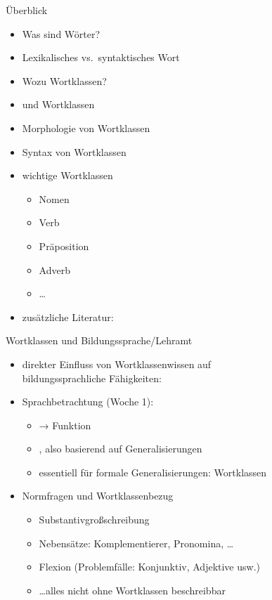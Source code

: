 \begin{frame}
  {Überblick}
  \pause
  \begin{itemize}[<+->]
    \item Was sind Wörter?
    \item Lexikalisches vs.\ syntaktisches Wort
      \Halbzeile
    \item Wozu Wortklassen?
    \item {} und Wortklassen
    \item \alert{Morphologie} von Wortklassen
    \item \alert{Syntax} von Wortklassen
      \Halbzeile
    \item wichtige Wortklassen
      \begin{itemize}[<+->]
        \item Nomen
        \item Verb
        \item Präposition
        \item Adverb
        \item \ldots
      \end{itemize}
      \Halbzeile
    \item zusätzliche Literatur: \citet{Engel2009}
  \end{itemize}
\end{frame}

\begin{frame}
  {Wortklassen und Bildungssprache\slash Lehramt}
  \pause
  \begin{itemize}[<+->]
    \item direkter Einfluss von Wortklassenwissen auf\\
      bildungssprachliche Fähigkeiten: 
      \Zeile
    \item Sprachbetrachtung (Woche 1):
      \begin{itemize}[<+->]
        \item {} → \alert{Funktion}
        \item {}, also basierend auf \alert{Generalisierungen}
        \item essentiell für formale Generalisierungen: \alert{Wortklassen}
      \end{itemize}
      \Zeile
    \item Normfragen und Wortklassenbezug
      \begin{itemize}
        \item \alert{Substantivgroßschreibung}
        \item Nebensätze: Komplementierer, Pronomina, \ldots
        \item Flexion (Problemfälle: Konjunktiv, Adjektive usw.)
        \item \dots alles nicht ohne Wortklassen beschreibbar
      \end{itemize}
  \end{itemize}
\end{frame}



